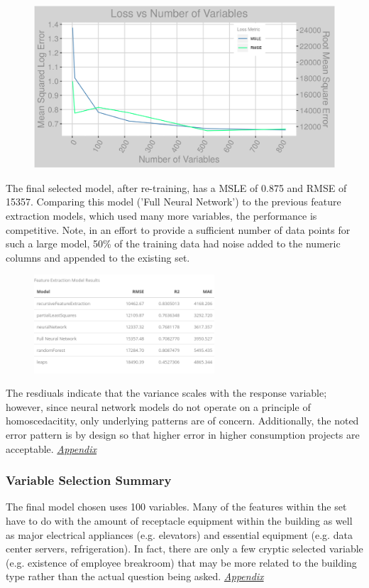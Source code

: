 \begin{figure}[h]
\centering
\includegraphics[width=\textwidth, height=0.25\textheight]{Images/electricity_nn_error.png}
\end{figure}

The final selected model, after re-training, has a MSLE of 0.875 and RMSE of 15357.  Comparing this model ('Full Neural Network') to the previous feature extraction models, which used many more variables, the performance is competitive.  Note, in an effort to provide a sufficient number of data points for such a large model, 50\% of the training data had noise added to the numeric columns and appended to the existing set.

\begin{figure}[h]
\centering
\includegraphics[width=0.6\textwidth, height=0.25\textheight]{Images/electricity_model_summary.png}
\end{figure}

The resdiuals indicate that the variance scales with the response variable; however, since neural network models do not operate on a principle of homoscedacitity, only underlying patterns are of concern. Additionally, the noted error pattern is by design so that higher error in higher consumption projects are acceptable.  \textit{\hyperref[appendix_nn:electricity:nn_full]{Appendix}}

\subsubsection{Variable Selection Summary}
The final model chosen uses 100 variables.  Many of the features within the set have to do with the amount of receptacle equipment within the building as well as major electrical appliances (e.g. elevators) and essential equipment (e.g. data center servers, refrigeration).  In fact, there are only a few cryptic selected variable (e.g. existence of employee breakroom) that may be more related to the building type rather than the actual question being asked.   \textit{\hyperref[appendix_nn:electricity:nn_full_variables]{Appendix}}

